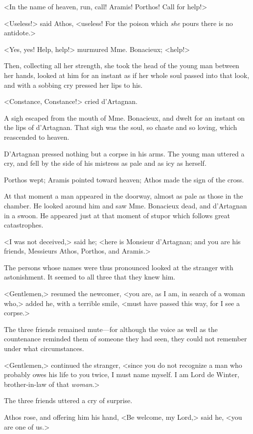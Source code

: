 <In the name of heaven, run, call! Aramis! Porthos! Call for help!> 

<Useless!> said Athos, <useless! For the poison which \textit{she} pours there is no antidote.> 

<Yes, yes! Help, help!> murmured Mme. Bonacieux; <help!> 

Then, collecting all her strength, she took the head of the young man between her hands, looked at him for an instant as if her whole soul passed into that look, and with a sobbing cry pressed her lips to his. 

<Constance, Constance!> cried d'Artagnan. 

A sigh escaped from the mouth of Mme. Bonacieux, and dwelt for an instant on the lips of d'Artagnan. That sigh was the soul, so chaste and so loving, which reascended to heaven. 

D'Artagnan pressed nothing but a corpse in his arms. The young man uttered a cry, and fell by the side of his mistress as pale and as icy as herself. 

Porthos wept; Aramis pointed toward heaven; Athos made the sign of the cross. 

At that moment a man appeared in the doorway, almost as pale as those in the chamber. He looked around him and saw Mme. Bonacieux dead, and d'Artagnan in a swoon. He appeared just at that moment of stupor which follows great catastrophes. 

<I was not deceived,> said he; <here is Monsieur d'Artagnan; and you are his friends, Messieurs Athos, Porthos, and Aramis.> 

The persons whose names were thus pronounced looked at the stranger with astonishment. It seemed to all three that they knew him. 

<Gentlemen,> resumed the newcomer, <you are, as I am, in search of a woman who,> added he, with a terrible smile, <must have passed this way, for I see a corpse.> 

The three friends remained mute---for although the voice as well as the countenance reminded them of someone they had seen, they could not remember under what circumstances. 

<Gentlemen,> continued the stranger, <since you do not recognize a man who probably owes his life to you twice, I must name myself. I am Lord de Winter, brother-in-law of that \textit{woman}.> 

The three friends uttered a cry of surprise. 

Athos rose, and offering him his hand, <Be welcome, my Lord,> said he, <you are one of us.> 

